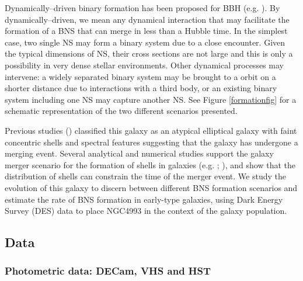 Dynamically--driven binary formation has been proposed for BBH (e.g. \citealt{bbh1}). By dynamically--driven, we mean any dynamical interaction that may facilitate the formation of a BNS that can merge in less than a Hubble time. In the simplest case, two single NS may form a binary system due to a close encounter. Given the typical dimensions of NS, their cross sections are not large and this is only a possibility in very dense stellar environments. Other dynamical processes may intervene: a widely separated binary system may be brought to a orbit on a shorter distance due to interactions with a third body, or an existing binary system including one NS may capture another NS. See Figure \ref{formationfig} for a schematic representation of the two different scenarios presented.

Previous studies (\citealt{1988MNRAS.235..813C}) classified this galaxy as an atypical elliptical galaxy with faint concentric shells and spectral features suggesting that the galaxy has undergone a merging event. Several analytical and numerical studies support the galaxy merger scenario for the formation of shells in galaxies (e.g. \citealt{quinn}; \citealt{pop}), and show that the distribution of shells can constrain the time of the merger event. We study the evolution of this galaxy to
discern between different BNS formation scenarios and estimate the rate of BNS formation in early-type galaxies, using Dark Energy Survey (DES) data to place NGC4993 in the context of the galaxy population.

\subsection{Data}\label{datasec}

\subsubsection{Photometric data: DECam, VHS and HST}

